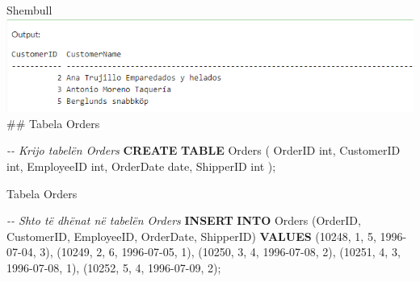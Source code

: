 \documentclass[
  ignorenonframetext,
]{beamer}
\newenvironment{Shaded}{\begin{snugshade}}{\end{snugshade}}
\newcommand{\CommentTok}[1]{\textcolor[rgb]{0.56,0.35,0.01}{\textit{#1}}}
\newcommand{\DataTypeTok}[1]{\textcolor[rgb]{0.13,0.29,0.53}{#1}}
\newcommand{\DecValTok}[1]{\textcolor[rgb]{0.00,0.00,0.81}{#1}}
\newcommand{\KeywordTok}[1]{\textcolor[rgb]{0.13,0.29,0.53}{\textbf{#1}}}
\newcommand{\NormalTok}[1]{#1}
\newcommand{\StringTok}[1]{\textcolor[rgb]{0.31,0.60,0.02}{#1}}
\begin{document}
\begin{frame}[fragile]{Shembull}
\label{shembull-21}
\includegraphics{./Figs/query76.png} \#\# Tabela Orders


\begin{Shaded}
\begin{Highlighting}[]
\CommentTok{{-}{-} Krijo tabelën Orders}
\KeywordTok{CREATE} \KeywordTok{TABLE}\NormalTok{ Orders (}
\NormalTok{    OrderID }\DataTypeTok{int}\NormalTok{,}
\NormalTok{    CustomerID }\DataTypeTok{int}\NormalTok{,}
\NormalTok{    EmployeeID }\DataTypeTok{int}\NormalTok{,}
\NormalTok{    OrderDate }\DataTypeTok{date}\NormalTok{,}
\NormalTok{    ShipperID }\DataTypeTok{int}
\NormalTok{);}
\end{Highlighting}
\end{Shaded}
\end{frame}

\begin{frame}[fragile]{Tabela Orders}
\label{tabela-orders}

\begin{Shaded}
\begin{Highlighting}[]
\CommentTok{{-}{-} Shto të dhënat në tabelën Orders}
\KeywordTok{INSERT} \KeywordTok{INTO}\NormalTok{ Orders (OrderID, CustomerID, EmployeeID, OrderDate, ShipperID) }\KeywordTok{VALUES}
\NormalTok{(}\DecValTok{10248}\NormalTok{, }\DecValTok{1}\NormalTok{, }\DecValTok{5}\NormalTok{, }\StringTok{\textquotesingle{}1996{-}07{-}04\textquotesingle{}}\NormalTok{, }\DecValTok{3}\NormalTok{),}
\NormalTok{(}\DecValTok{10249}\NormalTok{, }\DecValTok{2}\NormalTok{, }\DecValTok{6}\NormalTok{, }\StringTok{\textquotesingle{}1996{-}07{-}05\textquotesingle{}}\NormalTok{, }\DecValTok{1}\NormalTok{),}
\NormalTok{(}\DecValTok{10250}\NormalTok{, }\DecValTok{3}\NormalTok{, }\DecValTok{4}\NormalTok{, }\StringTok{\textquotesingle{}1996{-}07{-}08\textquotesingle{}}\NormalTok{, }\DecValTok{2}\NormalTok{),}
\NormalTok{(}\DecValTok{10251}\NormalTok{, }\DecValTok{4}\NormalTok{, }\DecValTok{3}\NormalTok{, }\StringTok{\textquotesingle{}1996{-}07{-}08\textquotesingle{}}\NormalTok{, }\DecValTok{1}\NormalTok{),}
\NormalTok{(}\DecValTok{10252}\NormalTok{, }\DecValTok{5}\NormalTok{, }\DecValTok{4}\NormalTok{, }\StringTok{\textquotesingle{}1996{-}07{-}09\textquotesingle{}}\NormalTok{, }\DecValTok{2}\NormalTok{);}
\end{Highlighting}
\end{Shaded}
\end{frame}
\end{document}
